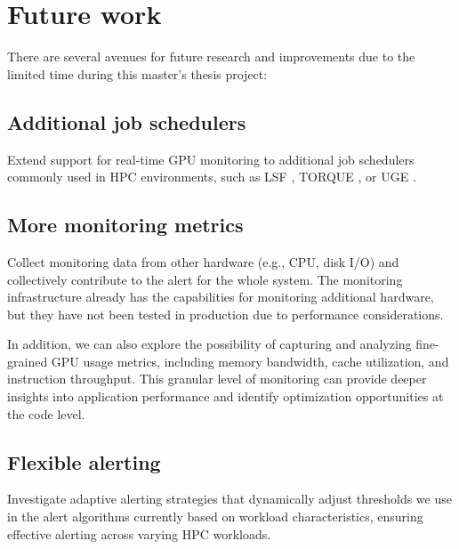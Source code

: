 
\section{Future work}
There are several avenues for future research and improvements due to the limited time during this master's thesis project:

\subsection{Additional job schedulers}
Extend support for real-time GPU monitoring to additional job schedulers commonly used in HPC environments, such as LSF \cite{10.1145/3569951.3597564}, TORQUE \cite{10.1145/1188455.1188464}, or UGE \cite{10.1145/3332186.3338408}.

\subsection{More monitoring metrics}
Collect monitoring data from other hardware (e.g., CPU, disk I/O) and collectively contribute to the alert for the whole system. The monitoring infrastructure already has the capabilities for monitoring additional hardware, but they have not been tested in production due to performance considerations.

In addition, we can also explore the possibility of capturing and analyzing fine-grained GPU usage metrics, including memory bandwidth, cache utilization, and instruction throughput. This granular level of monitoring can provide deeper insights into application performance and identify optimization opportunities at the code level.

\subsection{Flexible alerting}
Investigate adaptive alerting strategies that dynamically adjust thresholds we use in the alert algorithms currently based on workload characteristics, ensuring effective alerting across varying HPC workloads.


